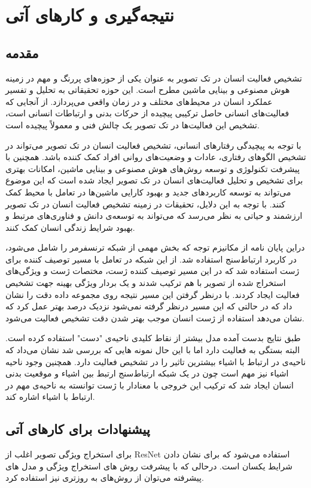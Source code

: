 \chapter{نتیجه‌گیری و کارهای آتی}
\section{مقدمه}
تشخیص فعالیت انسان در تک تصویر به عنوان یکی از حوزه‌های پررنگ و مهم در زمینه هوش مصنوعی و بینایی ماشین مطرح است. این حوزه تحقیقاتی به تحلیل و تفسیر عملکرد انسان در محیط‌های مختلف و در زمان واقعی می‌پردازد. از آنجایی که فعالیت‌های انسانی حاصل ترکیبی پیچیده از حرکات بدنی و ارتباطات انسانی است، تشخیص این فعالیت‌ها در تک تصویر یک چالش فنی و معمولاً پیچیده است.

با توجه به پیچیدگی رفتار‌های انسانی،‌ تشخیص فعالیت انسان در تک تصویر می‌تواند در تشخیص الگو‌های رفتاری،‌ عادات و وضعیت‌های روانی افراد کمک کننده باشد. همچنین با پیشرفت تکنولوژی و توسعه روش‌های هوش مصنوعی و بینایی ماشین، امکانات بهتری برای تشخیص و تحلیل فعالیت‌های انسان در تک تصویر ایجاد شده است که این موضوع می‌تواند به توسعه کاربرد‌های جدید  و بهبود کارایی ماشین‌ها در تعامل با محیط کمک کنند. با توجه به این دلایل، تحقیقات در زمینه تشخیص فعالیت انسان در تک تصویر ارزشمند و حیاتی به نظر می‌رسد که می‌تواند به توسعه‌ی دانش و فناوری‌های مرتبط و بهبود شرایط زندگی انسان کمک کنند.

دراین پایان نامه از مکانیزم توجه که بخش مهمی از شبکه ترنسفرمر را شامل می‌شود، در کاربرد ارتباط‌سنج استفاده شد. از این شبکه در تعامل با مسیر توصیف کننده برای ژست استفاده شد که در این مسیر توصیف کننده ژست، مختصات ژست و ویژگی‌های استخراج شده از تصویر با هم ترکیب شدند و یک بردار ویژگی بهینه جهت تشخیص فعالیت ایجاد کردند. با درنظر گرفتن این مسیر نتیجه روی مجموعه داده %
دقت %
را نشان داد که در حالتی که این مسیر درنظر گرفته نمی‌شود نزدیک %
درصد بهتر عمل کرد که نشان می‌دهد استفاده از ژست انسان موجب بهتر شدن دقت تشخیص فعالیت می‌شود.

طبق نتایج بدست آمده مدل بیشتر از نقاط کلیدی ناحیه‌ی "دست" استفاده کرده است. البته بستگی به فعالیت دارد اما با این حال نمونه هایی که بررسی شد نشان می‌داد که ناحیه‌ی در ارتباط با اشیاء بیشترین تاثیر را در تشخیص فعالیت دارد. 
همچنین وجود ناحیه اشیاء نیز مهم است چون در یک شبکه ارتباط‌سنج ارتبط بین اشیاء و موقعیت بدنی انسان ایجاد شد که ترکیب این خروجی با معنادار با ژست توانسته به ناحیه‌ی مهم در ارتباط با اشیاء اشاره کند.

\section{پیشنهادات برای کارهای آتی}
برای استخراج ویژگی تصویر اغلب از ResNet استفاده می‌شود که برای نشان دادن شرایط یکسان است. درحالی که با پیشرفت روش های استخراج ویژگی و مدل های پیشرفته می‌توان از روش‌های به روزتری نیز استفاده کرد.

